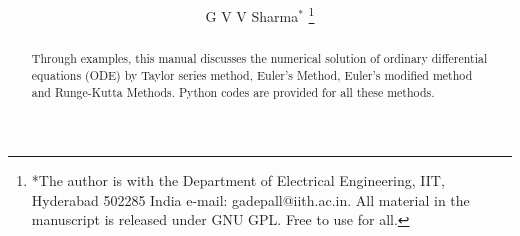 \documentclass[journal,12pt,twocolumn]{IEEEtran}
\begin{document}
\let\StandardTheFigure\thefigure
\renewcommand{\thefigure}{\theproblem}



\def\putbox#1#2#3{\makebox[0in][l]{\makebox[#1][l]{}\raisebox{\baselineskip}[0in][0in]{\raisebox{#2}[0in][0in]{#3}}}}
     \def\rightbox#1{\makebox[0in][r]{#1}}
     \def\centbox#1{\makebox[0in]{#1}}
     \def\topbox#1{\raisebox{-\baselineskip}[0in][0in]{#1}}
     \def\midbox#1{\raisebox{-0.5\baselineskip}[0in][0in]{#1}}

\vspace{3cm}

\title{ 
}

\author{G V V Sharma$^{*}$ %
\thanks{*The author is with the Department
of Electrical Engineering, IIT, Hyderabad
502285 India e-mail: gadepall@iith.ac.in. All material in the manuscript is released under GNU GPL.  Free to use for all.}%
}



\maketitle




\IEEEpeerreviewmaketitle

\bigskip

\begin{abstract}
Through examples, this manual discusses the numerical solution of ordinary differential equations (ODE)
by Taylor
series method,  Euler's Method, Euler's modified method and Runge-Kutta
Methods.  Python codes are provided for all these methods.
\end{abstract}
%
\end{document}
